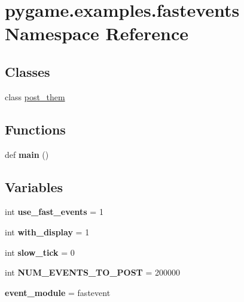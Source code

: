 \hypertarget{namespacepygame_1_1examples_1_1fastevents}{}\section{pygame.\+examples.\+fastevents Namespace Reference}
\label{namespacepygame_1_1examples_1_1fastevents}
\subsection*{Classes}
\begin{DoxyCompactItemize}
\item 
class \hyperlink{classpygame_1_1examples_1_1fastevents_1_1post__them}{post\+\_\+them}
\end{DoxyCompactItemize}
\subsection*{Functions}
\begin{DoxyCompactItemize}
\item 
\mbox{\label{namespacepygame_1_1examples_1_1fastevents_a8f8db80e3d6758d2a4071d47a2f5580f}} 
def {\bfseries main} ()
\end{DoxyCompactItemize}
\subsection*{Variables}
\begin{DoxyCompactItemize}
\item 
\mbox{\label{namespacepygame_1_1examples_1_1fastevents_adb9468856f4c91c554d39d767385986a}} 
int {\bfseries use\+\_\+fast\+\_\+events} = 1
\item 
\mbox{\label{namespacepygame_1_1examples_1_1fastevents_a40fa86a95c02a2728c521cd7e23d3559}} 
int {\bfseries with\+\_\+display} = 1
\item 
\mbox{\label{namespacepygame_1_1examples_1_1fastevents_a8b6abfd9fbc4b499734c0d3ff700d19c}} 
int {\bfseries slow\+\_\+tick} = 0
\item 
\mbox{\label{namespacepygame_1_1examples_1_1fastevents_a67038698868fadc07474be0a39bebbfc}} 
int {\bfseries N\+U\+M\+\_\+\+E\+V\+E\+N\+T\+S\+\_\+\+T\+O\+\_\+\+P\+O\+ST} = 200000
\item 
\mbox{\label{namespacepygame_1_1examples_1_1fastevents_abf474f3d982ed40c01b51f93cd262617}} 
{\bfseries event\+\_\+module} = fastevent
\end{DoxyCompactItemize}


